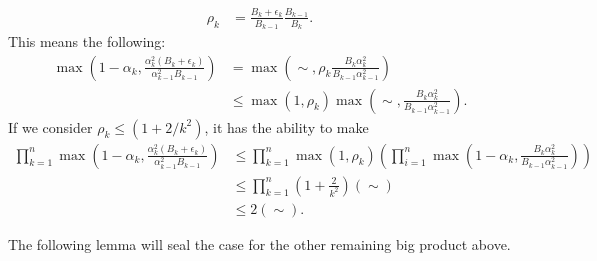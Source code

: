 \documentclass[12pt]{article}
\begin{document}
    \begin{align*}
        \rho_k &= \frac{B_k + \epsilon_k}{B_{k - 1}}\frac{B_{k - 1}}{B_k}.
    \end{align*}
    This means the following: 
    \begin{align*}
        \max\left(
            1 - \alpha_k, 
            \frac{\alpha_k^2(B_k + \epsilon_k)}{\alpha_{k - 1}^2B_{k - 1}}
        \right)
        &=
        \max\left(
            \sim, 
            \rho_k\frac{B_k\alpha_k^2}{B_{k - 1}\alpha_{k - 1}^2}
        \right)
        \\
        &\le \max(1, \rho_k)\max\left(
            \sim, 
            \frac{B_k\alpha_k^2}{B_{k - 1}\alpha_{k - 1}^2}
        \right). 
    \end{align*}
    If we consider $\rho_k \le (1 + 2/k^2)$, it has the ability to make
    \begin{align*}
        \prod_{k = 1}^{n} 
        \max \left(
            1 - \alpha_k, 
            \frac{\alpha_k^2(B_k + \epsilon_k)}{\alpha_{k - 1}^2B_{k - 1}}
        \right)
        &\le 
        \prod_{k = 1}^{n} 
        \max(1, \rho_k)
        \left(
        \prod_{i = 1}^{n}
            \max\left(
                1 - \alpha_k, 
                \frac{B_k\alpha_k^2}{B_{k - 1}\alpha_{k - 1}^2}
            \right)
        \right)
        \\
        &\le \prod_{k = 1}^n
        \left(
            1 + \frac{2}{k^2}
        \right)
        (\sim)
        \\
        &\le 2 (\sim). 
    \end{align*}

    The following lemma will seal the case for the other remaining big product above. 




\end{document}
